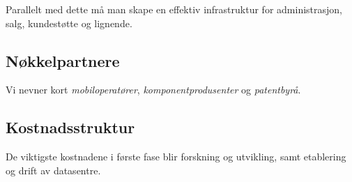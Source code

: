 Parallelt med dette må man skape en effektiv infrastruktur for administrasjon,
salg, kundestøtte og lignende.

\subsection{Nøkkelpartnere}

Vi nevner kort \textit{mobiloperatører}, \textit{komponentprodusenter} og
\textit{patentbyrå}.

\subsection{Kostnadsstruktur}

De viktigste kostnadene i første fase blir forskning og utvikling, samt
etablering og drift av datasentre.

